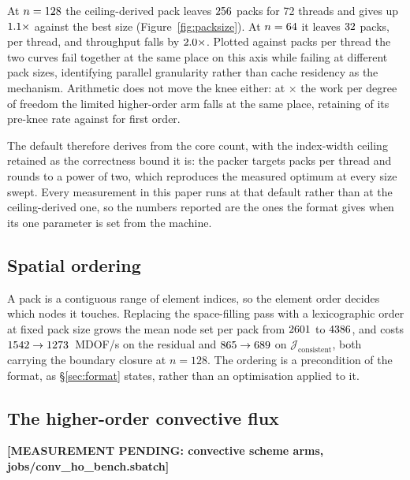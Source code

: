 \documentclass[sigconf,nonacm]{acmart}
\newcommand{\inputifready}[2]{%
  \IfFileExists{#1.tex}{}%
    {\textbf{[MEASUREMENT PENDING: #2]}}}
\newcommand{\Jex}{\mathcal{J}_{\mathrm{consistent}}}
\begin{document}
At $n=128{}$ the ceiling-derived pack leaves $256{}$ packs for 72 threads
and gives up $1.1\times$ against the best size (Figure~\ref{fig:packsize}). At
$n=64{}$ it leaves $32{}$ packs, \packSmallCeilPpt{} per thread, and
throughput falls by $2.0\times$. Plotted against packs per thread the two curves
fail together at the same place on this axis while failing at different pack sizes,
identifying parallel granularity rather than cache residency as the mechanism. Arithmetic does
not move the knee either: at \pkszHoWorkFactor$\times$ the work per degree of freedom the limited
higher-order arm falls at the same place, retaining \pkszKneeHo{} of its pre-knee rate against
\pkszKneeFo{} for first order.

The default therefore derives from the core count, with the index-width ceiling retained as the
correctness bound it is: the packer targets \packsPerThread{} packs per thread and rounds to a
power of two, which reproduces the measured optimum at every size swept. Every measurement in
this paper runs at that default rather than at the ceiling-derived one, so the numbers reported
are the ones the format gives when its one parameter is set from the machine.

\subsection{Spatial ordering}
\label{sec:res:ordering}

A pack is a contiguous range of element indices, so the element order decides which nodes it
touches. Replacing the space-filling pass with a lexicographic order at fixed pack size grows the
mean node set per pack from $2601{}$ to $4386{}$, and costs
$1542{}\to1273{}$~MDOF/s on the residual and $865{}\to689{}$ on
$\Jex$, both carrying the boundary closure at $n=128$. The ordering is
a precondition of the format, as \S\ref{sec:format} states, rather than an optimisation applied
to it.

\subsection{The higher-order convective flux}
\label{sec:res:convho}

\begin{table}[t]
  \centering
  \caption{Convective schemes, residual only, at $n=128$, carrying the Rhie--Chow coupling as
    every other complete-operator measurement here does. The nodal velocity gradient is hoisted,
    so the timing is of the flux rather than of the reconstruction feeding it. Each column is
    that layout's shipped kernel. As in Table~\ref{tab:ladder}, the ratios compare whole
    implementations: element colouring also changes traversal and synchronization,
    so it does not isolate atomic-update cost. The \texttt{f32} group is the single-precision build, measured in
    the same allocation.}
  \label{tab:convho}
  \inputifready{tables/convho}{convective scheme arms, jobs/conv\_ho\_bench.sbatch}
\end{table}
\end{document}

